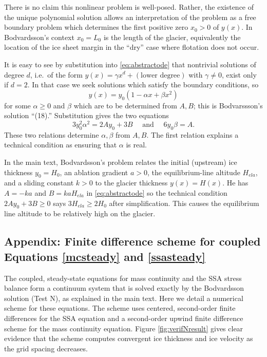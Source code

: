 \documentclass[twocolumn,letterpaper]{igs}
\begin{document}
There is no claim this nonlinear problem is well-posed.  Rather, the existence of the unique polynomial solution allows an interpretation of the problem as a free boundary problem which determines the first positive zero $x_0>0$ of $y(x)$.  In Bodvardsson's context $x_0=L_0$ is the length of the glacier, equivalently the location of the ice sheet margin in the ``dry'' case where flotation does not occur.

It is easy to see by substitution into \eqref{eq:abstractode} that nontrivial solutions of degree $d$, i.e.~of the form $y(x) = \gamma x^d + (\text{lower degree})$ with $\gamma\ne 0$, exist only if $d=2$.  In that case we seek solutions which satisfy the boundary conditions, so
\begin{equation}
y(x) = y_0(1 - \alpha x + \beta x^2)  \label{eq:abstractsoln}
\end{equation}
for some $\alpha\ge 0$ and $\beta$ which are to be determined from $A,B$; this is Bodvarssson's solution ``(18).''  Substitution gives the two equations
\begin{equation}
3 y_0^2 \alpha^2 = 2 A y_0 + 3 B \quad \text{ and } \quad 6 y_0 \beta = A.  \label{eq:abstractrelations}
\end{equation}
These two relations determine $\alpha,\beta$ from $A,B$.  The first relation explains a technical condition as ensuring that $\alpha$ is real.

In the main text, Bodvardsson's problem relates the initial (upstream) ice thickness $y_0=H_0$, an ablation gradient $a>0$, the equilibrium-line altitude $H_{ela}$, and a sliding constant $k>0$ to the glacier thickness $y(x) = H(x)$.  He has $A=-ka$ and $B=k a H_{ela}$ in \eqref{eq:abstractode} so the technical condition $2A y_0 + 3 B \ge 0$ says $3 H_{ela} \ge 2 H_0$ after simplification.  This causes the equilibrium line altitude to be relatively high on the glacier.


\subsection{Appendix: Finite difference scheme for coupled Equations \eqref{mcsteady} and \eqref{ssasteady}}  The coupled, steady-state equations for mass continuity and the SSA stress balance form a continuum system that is solved exactly by the Bodvardsson solution (Test N), as explained in the main text.  Here we detail a numerical scheme for these equations.  The scheme uses centered, second-order finite differences for the SSA equation and a second-order upwind finite difference scheme for the mass continuity equation.  Figure \ref{fig:verifNresult} gives clear evidence that the scheme computes convergent ice thickness and ice velocity as the grid spacing decreases.
\end{document}
